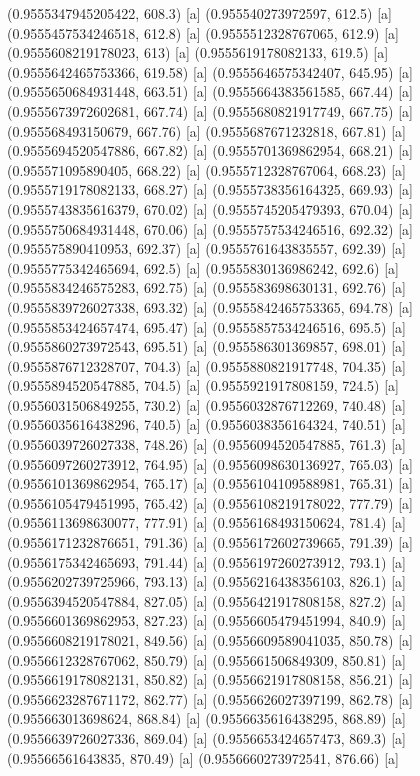 {{{(0.9555347945205422, 608.3) [a] 
(0.955540273972597, 612.5) [a] 
(0.9555457534246518, 612.8) [a] 
(0.9555512328767065, 612.9) [a] 
(0.9555608219178023, 613) [a] 
(0.9555619178082133, 619.5) [a] 
(0.9555642465753366, 619.58) [a] 
(0.9555646575342407, 645.95) [a] 
(0.9555650684931448, 663.51) [a] 
(0.9555664383561585, 667.44) [a] 
(0.9555673972602681, 667.74) [a] 
(0.9555680821917749, 667.75) [a] 
(0.955568493150679, 667.76) [a] 
(0.9555687671232818, 667.81) [a] 
(0.9555694520547886, 667.82) [a] 
(0.9555701369862954, 668.21) [a] 
(0.955571095890405, 668.22) [a] 
(0.9555712328767064, 668.23) [a] 
(0.9555719178082133, 668.27) [a] 
(0.9555738356164325, 669.93) [a] 
(0.9555743835616379, 670.02) [a] 
(0.9555745205479393, 670.04) [a] 
(0.9555750684931448, 670.06) [a] 
(0.9555757534246516, 692.32) [a] 
(0.955575890410953, 692.37) [a] 
(0.9555761643835557, 692.39) [a] 
(0.9555775342465694, 692.5) [a] 
(0.9555830136986242, 692.6) [a] 
(0.9555834246575283, 692.75) [a] 
(0.955583698630131, 692.76) [a] 
(0.9555839726027338, 693.32) [a] 
(0.9555842465753365, 694.78) [a] 
(0.9555853424657474, 695.47) [a] 
(0.9555857534246516, 695.5) [a] 
(0.9555860273972543, 695.51) [a] 
(0.955586301369857, 698.01) [a] 
(0.9555876712328707, 704.3) [a] 
(0.9555880821917748, 704.35) [a] 
(0.9555894520547885, 704.5) [a] 
(0.9555921917808159, 724.5) [a] 
(0.9556031506849255, 730.2) [a] 
(0.9556032876712269, 740.48) [a] 
(0.9556035616438296, 740.5) [a] 
(0.9556038356164324, 740.51) [a] 
(0.9556039726027338, 748.26) [a] 
(0.9556094520547885, 761.3) [a] 
(0.9556097260273912, 764.95) [a] 
(0.9556098630136927, 765.03) [a] 
(0.9556101369862954, 765.17) [a] 
(0.9556104109588981, 765.31) [a] 
(0.9556105479451995, 765.42) [a] 
(0.9556108219178022, 777.79) [a] 
(0.9556113698630077, 777.91) [a] 
(0.9556168493150624, 781.4) [a] 
(0.9556171232876651, 791.36) [a] 
(0.9556172602739665, 791.39) [a] 
(0.9556175342465693, 791.44) [a] 
(0.9556197260273912, 793.1) [a] 
(0.9556202739725966, 793.13) [a] 
(0.9556216438356103, 826.1) [a] 
(0.9556394520547884, 827.05) [a] 
(0.9556421917808158, 827.2) [a] 
(0.9556601369862953, 827.23) [a] 
(0.9556605479451994, 840.9) [a] 
(0.9556608219178021, 849.56) [a] 
(0.9556609589041035, 850.78) [a] 
(0.9556612328767062, 850.79) [a] 
(0.955661506849309, 850.81) [a] 
(0.9556619178082131, 850.82) [a] 
(0.9556621917808158, 856.21) [a] 
(0.9556623287671172, 862.77) [a] 
(0.9556626027397199, 862.78) [a] 
(0.955663013698624, 868.84) [a] 
(0.9556635616438295, 868.89) [a] 
(0.9556639726027336, 869.04) [a] 
(0.9556653424657473, 869.3) [a] 
(0.95566561643835, 870.49) [a] 
(0.9556660273972541, 876.66) [a] 
}}}
